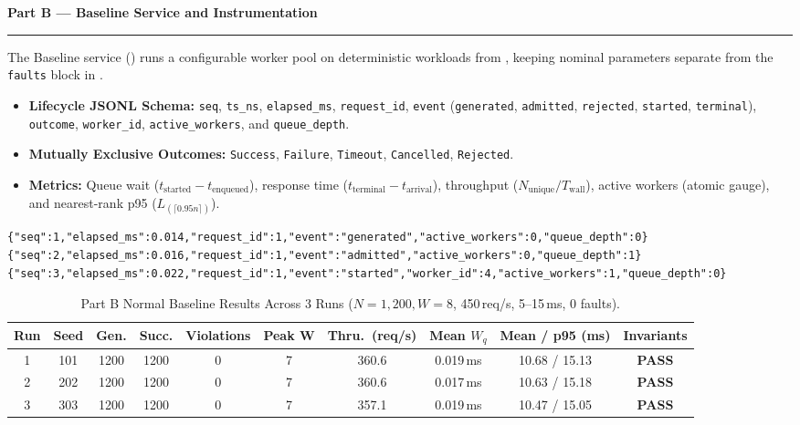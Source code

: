 \documentclass[11pt]{article}
\newcommand{\partheader}[1]{%
    \vspace{1.0em}%
    {\noindent\fontsize{13.5}{16}\selectfont\textbf{\color{accentblue}#1}\par}%
    \vspace{0.2em}\hrule\vspace{0.7em}%
}
\begin{document}
\newpage
\partheader{Part B --- Baseline Service and Instrumentation}

The Baseline service () runs a configurable worker pool on deterministic workloads from , keeping nominal parameters separate from the \texttt{faults} block in .

\begin{itemize}
    \item \textbf{Lifecycle JSONL Schema:} \texttt{seq}, \texttt{ts\_ns}, \texttt{elapsed\_ms}, \texttt{request\_id}, \texttt{event} (\texttt{generated}, \texttt{admitted}, \texttt{rejected}, \texttt{started}, \texttt{terminal}), \texttt{outcome}, \texttt{worker\_id}, \texttt{active\_workers}, and \texttt{queue\_depth}.
    \item \textbf{Mutually Exclusive Outcomes:} \texttt{Success}, \texttt{Failure}, \texttt{Timeout}, \texttt{Cancelled}, \texttt{Rejected}.
    \item \textbf{Metrics:} Queue wait ($t_{\text{started}} - t_{\text{enqueued}}$), response time ($t_{\text{terminal}} - t_{\text{arrival}}$), throughput ($N_{\text{unique}} / T_{\text{wall}}$), active workers (atomic gauge), and nearest-rank p95 ($L_{(\lceil 0.95n \rceil)}$).
\end{itemize}

\begin{lstlisting}[style=logstyle]
{"seq":1,"elapsed_ms":0.014,"request_id":1,"event":"generated","active_workers":0,"queue_depth":0}
{"seq":2,"elapsed_ms":0.016,"request_id":1,"event":"admitted","active_workers":0,"queue_depth":1}
{"seq":3,"elapsed_ms":0.022,"request_id":1,"event":"started","worker_id":4,"active_workers":1,"queue_depth":0}
\end{lstlisting}

\begin{table}[htbp]
\centering
\caption{Part B Normal Baseline Results Across 3 Runs ($N=1{,}200, W=8$, 450\,req/s, 5--15\,ms, 0 faults).}
\footnotesize
\begin{tabular}{@{}cccccccccc@{}}
\toprule
\textbf{Run} & \textbf{Seed} & \textbf{Gen.} & \textbf{Succ.} & \textbf{Violations} & \textbf{Peak W} & \textbf{Thru.\ (req/s)} & \textbf{Mean $W_q$} & \textbf{Mean / p95 (ms)} & \textbf{Invariants} \\
\midrule
1 & 101 & 1200 & 1200 & 0 & 7 & 360.6 & 0.019\,ms & 10.68 / 15.13 & \textbf{PASS} \\
2 & 202 & 1200 & 1200 & 0 & 7 & 360.6 & 0.017\,ms & 10.63 / 15.18 & \textbf{PASS} \\
3 & 303 & 1200 & 1200 & 0 & 7 & 357.1 & 0.019\,ms & 10.47 / 15.05 & \textbf{PASS} \\
\bottomrule
\end{tabular}
\end{table}
\end{document}
